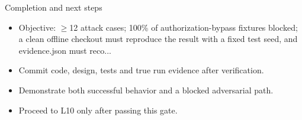 \documentclass[aspectratio=169,10pt]{beamer}
\begin{document}
\begin{frame}{Completion and next steps}
\small
\begin{itemize}
\item Objective: $\geq$12 attack cases; 100\% of authorization-bypass fixtures blocked; a clean offline checkout must reproduce the result with a fixed test seed, and evidence.json must reco...
\item Commit code, design, tests and true run evidence after verification.
\item Demonstrate both successful behavior and a blocked adversarial path.
\item Proceed to L10 only after passing this gate.
\end{itemize}

\end{frame}
\end{document}
